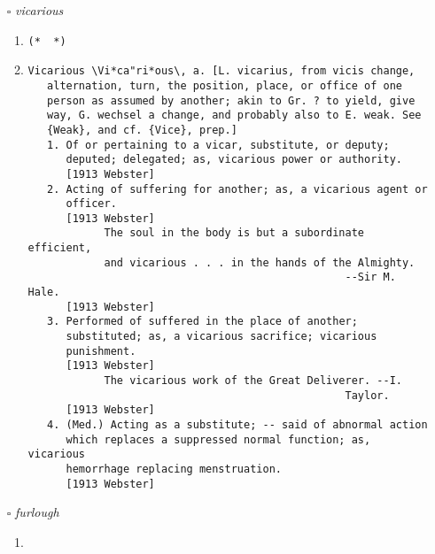\documentclass{article}
\begin{document}
\begin{itemize}
\begin{enumerate}
\item{
\begin{lstlisting}
(*  *)
\end{lstlisting}}
\item{
\begin{lstlisting}
curvaceous \curvaceous\ adj.
   having a pronounced womanly shape; having a slender waist
   with prominent breasts and hips. [chiefly dialect]
   Syn: bosomy, buxom, full-bosomed, sonsie, sonsy, voluptuous.
        [WordNet 1.5 +PJC]
\end{lstlisting}}
\end{enumerate}
\item[$\square$] \emph{ vicarious }
\begin{enumerate}
\item{
\begin{lstlisting}
(*  *)
\end{lstlisting}}
\item{
\begin{lstlisting}
Vicarious \Vi*ca"ri*ous\, a. [L. vicarius, from vicis change,
   alternation, turn, the position, place, or office of one
   person as assumed by another; akin to Gr. ? to yield, give
   way, G. wechsel a change, and probably also to E. weak. See
   {Weak}, and cf. {Vice}, prep.]
   1. Of or pertaining to a vicar, substitute, or deputy;
      deputed; delegated; as, vicarious power or authority.
      [1913 Webster]
   2. Acting of suffering for another; as, a vicarious agent or
      officer.
      [1913 Webster]
            The soul in the body is but a subordinate efficient,
            and vicarious . . . in the hands of the Almighty.
                                                  --Sir M. Hale.
      [1913 Webster]
   3. Performed of suffered in the place of another;
      substituted; as, a vicarious sacrifice; vicarious
      punishment.
      [1913 Webster]
            The vicarious work of the Great Deliverer. --I.
                                                  Taylor.
      [1913 Webster]
   4. (Med.) Acting as a substitute; -- said of abnormal action
      which replaces a suppressed normal function; as, vicarious
      hemorrhage replacing menstruation.
      [1913 Webster]
\end{lstlisting}}
\end{enumerate}
\item[$\square$] \emph{ furlough }
\begin{enumerate}
\item{
}
\end{enumerate}
\end{itemize}
\end{document}
